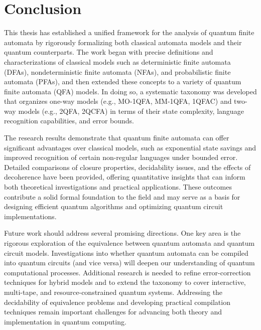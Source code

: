 \chapter{Conclusion}
\label{chap:conclusion}

This thesis has established a unified framework for the analysis of quantum finite automata by rigorously formalizing both classical automata models and their quantum counterparts. The work began with precise definitions and characterizations of classical models such as deterministic finite automata (DFAs), nondeterministic finite automata (NFAs), and probabilistic finite automata (PFAs), and then extended these concepts to a variety of quantum finite automata (QFA) models. In doing so, a systematic taxonomy was developed that organizes one-way models (e.g., MO-1QFA, MM-1QFA, 1QFAC) and two-way models (e.g., 2QFA, 2QCFA) in terms of their state complexity, language recognition capabilities, and error bounds.

The research results demonstrate that quantum finite automata can offer significant advantages over classical models, such as exponential state savings and improved recognition of certain non-regular languages under bounded error. Detailed comparisons of closure properties, decidability issues, and the effects of decoherence have been provided, offering quantitative insights that can inform both theoretical investigations and practical applications. These outcomes contribute a solid formal foundation to the field and may serve as a basis for designing efficient quantum algorithms and optimizing quantum circuit implementations.

Future work should address several promising directions. One key area is the rigorous exploration of the equivalence between quantum automata and quantum circuit models. Investigations into whether quantum automata can be compiled into quantum circuits (and vice versa) will deepen our understanding of quantum computational processes. Additional research is needed to refine error-correction techniques for hybrid models and to extend the taxonomy to cover interactive, multi-tape, and resource-constrained quantum systems. Addressing the decidability of equivalence problems and developing practical compilation techniques remain important challenges for advancing both theory and implementation in quantum computing.
